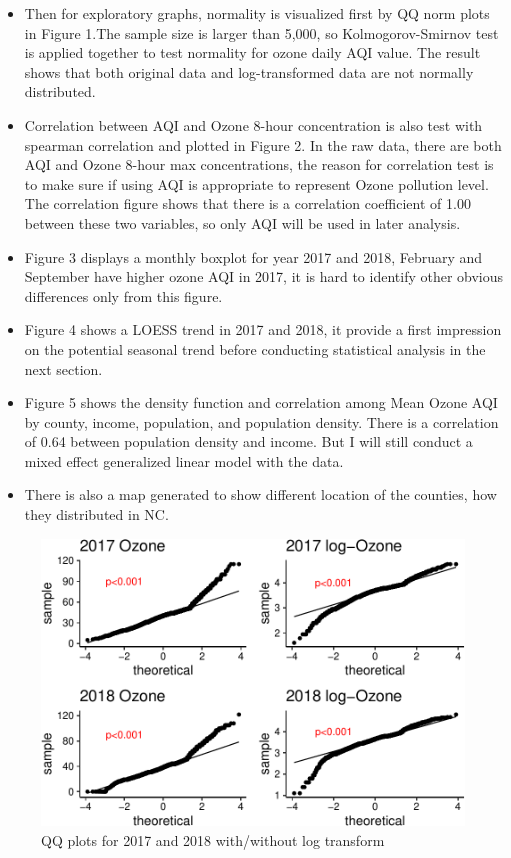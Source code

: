 \documentclass[12pt,]{article}
\begin{document}
\begin{itemize}
\item[]   Then for exploratory graphs, normality is visualized first by QQ norm plots in Figure 1.The sample size is larger than 5,000, so Kolmogorov-Smirnov test is applied together to test normality for ozone daily AQI value. The result shows that both original data and log-transformed data are not normally distributed. \
\item[] Correlation between AQI and Ozone 8-hour concentration is also test with spearman correlation and plotted in Figure 2. In the raw data, there are both AQI and Ozone 8-hour max concentrations, the reason for correlation test is to make sure if using AQI is appropriate to represent Ozone pollution level. The correlation figure shows that there is a correlation coefficient of 1.00 between these two variables, so only AQI will be used in later analysis.   \item[] Figure 3 displays a monthly boxplot for year 2017 and 2018, February and September have higher ozone AQI in 2017, it is hard to identify other obvious differences only from this figure. \
\item[] Figure 4 shows a LOESS trend in 2017 and 2018, it provide a first impression on the potential seasonal trend before conducting statistical analysis in the next section. \
\item[] Figure 5 shows the density function and correlation among Mean Ozone AQI by county, income, population, and population density. There is a correlation of 0.64 between population density and income. But I will still conduct a mixed effect generalized linear model with the data.
\item[] There is also a map generated to show different location of the counties, how they distributed in NC.
\end{itemize}

\begin{figure}
\centering
\includegraphics{Xia_ENV_872_Project_files/figure-latex/exploration 1-1.pdf}
\caption{QQ plots for 2017 and 2018 with/without log transform}
\end{figure}
\end{document}

